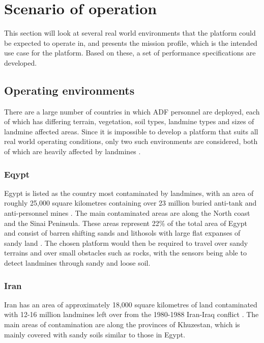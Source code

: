 \documentclass[main.tex]{subfiles}
\begin{document}
\section{Scenario of operation}
This section will look at several real world environments that the platform could be expected to operate in, and presents the mission profile, which is the intended use case for the platform. Based on these, a set of performance specifications are developed.  

\subsection{Operating environments}
There are a large number of countries in which ADF personnel are deployed, each of which has differing terrain, vegetation, soil types, landmine types and sizes of landmine affected areas. Since it is impossible to develop a platform that suits all real world operating conditions, only two such environments are considered, both of which are heavily affected by landmines \parencite{AustralianGovernment2016}. 

\subsubsection{Eqypt}
Egypt is listed as the country most contaminated by landmines, with an area of roughly 25,000 square kilometres containing over 23 million buried anti-tank and anti-personnel mines \parencite{Rushfan2008}. The main contaminated areas are along the North coast and the Sinai Peninsula. These areas represent 22\% of the total area of Egypt and consist of barren shifting sands and lithosols with large flat expanses of sandy land \parencite{Nahrawy2011}. The chosen platform would then be required to travel over sandy terrains and over small obstacles such as rocks, with the sensors being able to detect landmines through sandy and loose soil. 
 \subsubsection{Iran}
Iran has an area of approximately 18,000 square kilometres of land contaminated with 12-16 million landmines left over from the 1980-1988 Iran-Iraq conflict \parencite{landmineMonitor2015}. The main areas of contamination are along the provinces of Khuzestan, which is mainly covered with sandy soils similar to those in Egypt. 
\end{document}
